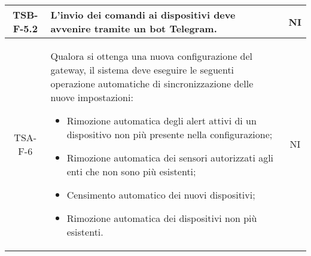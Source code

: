 \begin{center}
\begin{longtable}{|c|p{10cm}|c|}
			  \hline
			  TSB-F-5.2 & L'invio dei comandi ai dispositivi deve avvenire tramite un bot Telegram. & NI \\
			  \hline
			  TSA-F-6 & Qualora si ottenga una nuova configurazione del gateway, il sistema deve eseguire le seguenti operazione automatiche di sincronizzazione delle nuove impostazioni:
			  \begin{itemize}
			  	\item Rimozione automatica degli alert attivi di un dispositivo non più presente nella configurazione;
			  	\item Rimozione automatica dei sensori autorizzati agli enti che non sono più esistenti;
			  	\item Censimento automatico dei nuovi dispositivi;
			  	\item Rimozione automatica dei dispositivi non più esistenti.
			  \end{itemize} & NI \\
			  \hline
			\end{longtable}
		\end{center}

